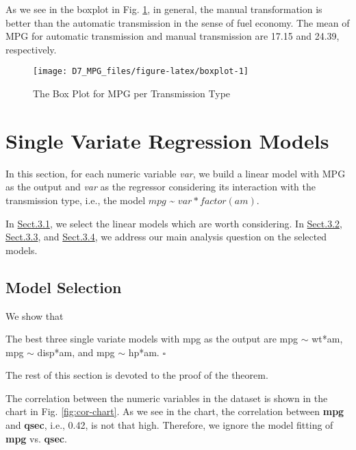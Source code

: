\documentclass[]{article}
\begin{document}
As we see in the boxplot in Fig. \ref{fig:boxplot}, in general, the
manual transformation is better than the automatic transmission in the
sense of fuel economy. The mean of MPG for automatic transmission and
manual transmission are 17.15 and 24.39, respectively.\\

\begin{figure}[H]

{\centering \texttt{[image: D7\_MPG\_files/figure-latex/boxplot-1]} 

}

\caption{\label{fig:boxplot}The Box Plot for MPG per Transmission Type}\label{fig:boxplot}
\end{figure}

\hypertarget{sec-single}{\section{Single Variate Regression
Models}\label{sec-single}}

In this section, for each numeric variable \emph{var}, we build a linear
model with MPG as the output and \emph{var} as the regressor considering
its interaction with the transmission type, i.e., the model \(mpg\)
\textasciitilde{} \(var * factor(am)\).

In \protect\hyperlink{sec-sing-select}{Sect.3.1}, we select the linear
models which are worth considering. In
\protect\hyperlink{sec-fit-wt}{Sect.3.2},
\protect\hyperlink{sec-fit-disp}{Sect.3.3}, and
\protect\hyperlink{sec-fit-hp}{Sect.3.4}, we address our main analysis
question on the selected models.

\hypertarget{sec-sing-select}{\subsection{Model
Selection}\label{sec-sing-select}}

We show that

\begin{theorem}
The best three single variate models with mpg as the output are mpg $\sim$ wt*am, mpg $\sim$ disp*am, and mpg $\sim$ hp*am. $\square$
\end{theorem}

The rest of this section is devoted to the proof of the theorem.

The correlation between the numeric variables in the dataset is shown in
the chart in Fig. \ref{fig:cor-chart}. As we see in the chart, the
correlation between \textbf{mpg} and \textbf{qsec}, i.e., 0.42, is not
that high. Therefore, we ignore the model fitting of \textbf{mpg} vs.
\textbf{qsec}.\\
\end{document}

